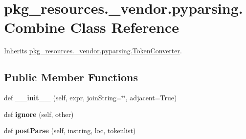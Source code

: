 \hypertarget{classpkg__resources_1_1__vendor_1_1pyparsing_1_1_combine}{}\section{pkg\+\_\+resources.\+\_\+vendor.\+pyparsing.\+Combine Class Reference}
\label{classpkg__resources_1_1__vendor_1_1pyparsing_1_1_combine}


Inherits \hyperlink{classpkg__resources_1_1__vendor_1_1pyparsing_1_1_token_converter}{pkg\+\_\+resources.\+\_\+vendor.\+pyparsing.\+Token\+Converter}.

\subsection*{Public Member Functions}
\begin{DoxyCompactItemize}
\item 
\mbox{\label{classpkg__resources_1_1__vendor_1_1pyparsing_1_1_combine_ac486d333729481aca8d159b774785864}} 
def {\bfseries \+\_\+\+\_\+init\+\_\+\+\_\+} (self, expr, join\+String=\char`\"{}\char`\"{}, adjacent=True)
\item 
\mbox{\label{classpkg__resources_1_1__vendor_1_1pyparsing_1_1_combine_a201aab275db8da28248836cd7b06051b}} 
def {\bfseries ignore} (self, other)
\item 
\mbox{\label{classpkg__resources_1_1__vendor_1_1pyparsing_1_1_combine_ac14783e106dea5800c9ac3b3dcb58c02}} 
def {\bfseries post\+Parse} (self, instring, loc, tokenlist)
\end{DoxyCompactItemize}
